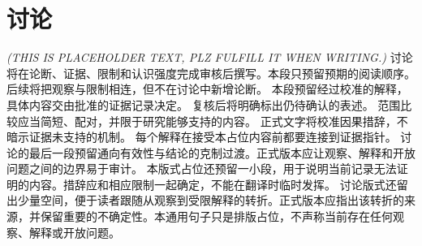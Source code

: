 \section{讨论}\label{sec:discussion}
\textit{(THIS IS PLACEHOLDER TEXT, PLZ FULFILL IT WHEN WRITING.)}
讨论将在论断、证据、限制和认识强度完成审核后撰写。本段只预留预期的阅读顺序。
后续将把观察与限制相连，但不在讨论中新增论断。
本段预留经过校准的解释，具体内容交由批准的证据记录决定。
复核后将明确标出仍待确认的表述。
范围比较应当简短、配对，并限于研究能够支持的内容。
正式文字将校准因果措辞，不暗示证据未支持的机制。
每个解释在接受本占位内容前都要连接到证据指针。
讨论的最后一段预留通向有效性与结论的克制过渡。正式版本应让观察、解释和开放问题之间的边界易于审计。
本版式占位还预留一小段，用于说明当前记录无法证明的内容。措辞应和相应限制一起确定，不能在翻译时临时发挥。
讨论版式还留出少量空间，便于读者跟随从观察到受限解释的转折。正式版本应指出该转折的来源，并保留重要的不确定性。本通用句子只是排版占位，不声称当前存在任何观察、解释或开放问题。
